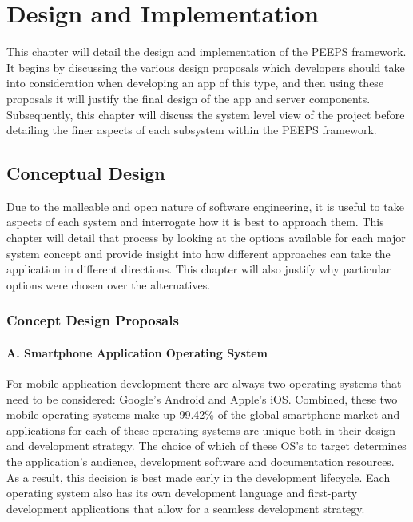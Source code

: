 \chapter{Design and Implementation}
This chapter will detail the design and implementation of the PEEPS framework. It begins by discussing the various design proposals which developers should take into consideration when developing an app of this type, and then using these proposals it will justify the final design of the app and server components. Subsequently, this chapter will discuss the system level view of the project before detailing the finer aspects of each subsystem within the PEEPS framework.

\section{Conceptual Design}
Due to the malleable and open nature of software engineering, it is useful to take aspects of each system and interrogate how it is best to approach them. This chapter will detail that process by looking at the options available for each major system concept and provide insight into how different approaches can take the application in different directions. This chapter will also justify why particular options were chosen over the alternatives.  

\subsection{Concept Design Proposals}
\label{sec:design_proposals}

\subsubsection{A. Smartphone Application Operating System}

For mobile application development there are always two operating systems that need to be considered: Google's Android and Apple's iOS. Combined, these two mobile operating systems make up 99.42\% of the global smartphone market \cite{StatCounter} and applications for each of these operating systems are unique both in their design and development strategy. The choice of which of these OS's to target determines the application's audience, development software and documentation resources. As a result, this decision is best made early in the development lifecycle. Each operating system also has its own development language and first-party development applications that allow for a seamless development strategy. 

